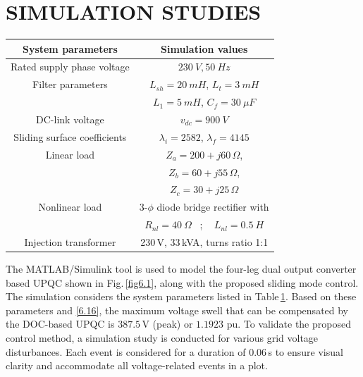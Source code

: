 \section{SIMULATION STUDIES}
\begin{table}[] 
	\centering
	\label{Table6.2}
	\begin{tabular}{>{\small}c>{\small}c}  
		\hline
		\hline
		\textbf{\footnotesize System parameters} & \textbf{\footnotesize Simulation values}\\
		\hline
		\footnotesize Rated supply phase voltage & \footnotesize$230 ~\si{V}, 50 ~\si{Hz}$ \\
		\footnotesize Filter parameters & \footnotesize $L_{sh} = 20 ~\si{mH}$, $L_{t} = 3 ~\si{mH}$ \\ & \footnotesize $L_{1} = 5 ~\si{mH}$, $C_{f} = 30 ~\si{\mu F}$ \\ 
		\footnotesize DC-link voltage & \footnotesize $v_{dc} = 900 ~\si{V}$ \\
		\footnotesize Sliding surface coefficients & \footnotesize $\lambda_i = 2582$, $\lambda_f = 4145$ \\
		\footnotesize Linear load  &  \footnotesize $Z_{a} = 200+j60\,\si{\Omega}$, \\ & \footnotesize $Z_{b} = 60+j55\, \si{\Omega}$, \\  & \footnotesize $Z_{c} = 30+j25\, \si{\Omega}$ \\
		\footnotesize Nonlinear load  &  \footnotesize $3$-$\phi$ diode bridge rectifier with \\ & \footnotesize $R_{nl} = 40  ~\Omega$ ~; ~ $L_{nl} = 0.5 ~\si{H}$ \\ 
		\footnotesize Injection transformer & \footnotesize 230\,\si{V}, 33\,\si{kVA}, turns ratio 1:1 \\
		\hline
		\hline 
	\end{tabular} \vspace*{-0.5cm}
\end{table}
The MATLAB/Simulink tool is used to model the four-leg dual output converter based UPQC shown in Fig.\,\ref{fig6.1}, along with the proposed sliding mode control. The simulation considers the system parameters listed in Table\,\ref{Table6.2}. Based on these parameters and \eqref{6.16}, the maximum voltage swell that can be compensated by the DOC-based UPQC is $387.5 \,$V (peak) or $1.1923$ pu. To validate the proposed control method, a simulation study is conducted for various grid voltage disturbances. Each event is considered for a duration of 0.06\,s to ensure visual clarity and accommodate all voltage-related events in a plot.

